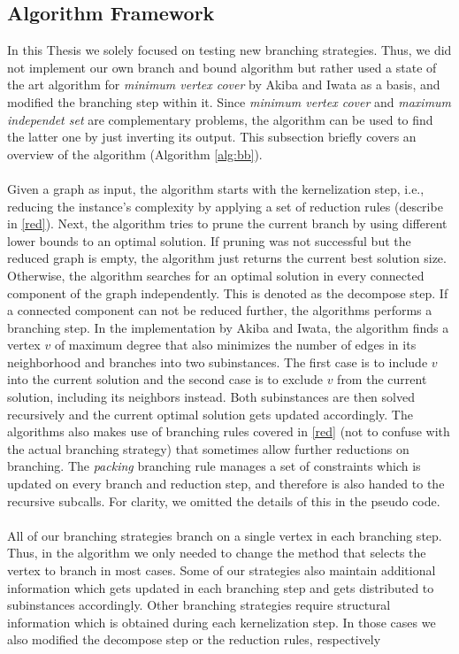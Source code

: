 \documentclass[]{article}
\begin{document}
\subsection{Algorithm Framework}

In this Thesis we solely focused on testing new branching strategies. Thus, we did not implement our own branch and bound algorithm but rather used a state of the art algorithm for \textit{minimum vertex cover} by Akiba and Iwata \cite{AkibaIwata} as a basis, and modified the branching step within it. Since \textit{minimum vertex cover} and \textit{maximum independet set} are complementary problems, the algorithm can be used to find the latter one by just inverting its output. This subsection briefly covers an overview of the algorithm (Algorithm \ref{alg:bb}).\\\\
Given a graph as input, the algorithm starts with the kernelization step, i.e., reducing the instance's complexity by applying a set of reduction rules (describe in \ref{red}). Next, the algorithm tries to prune the current branch by using different lower bounds to an optimal solution. If pruning was not successful but the reduced graph is empty, the algorithm just returns the current best solution size. Otherwise, the algorithm searches for an optimal solution in every connected component of the graph independently. This is denoted as the decompose step. If a connected component can not be reduced further, the algorithms performs a branching step. In the implementation by Akiba and Iwata, the algorithm finds a vertex $v$ of maximum degree that also minimizes the number of edges in its neighborhood and branches into two subinstances. The first case is to include $v$ into the current solution and the second case is to exclude $v$ from the current solution, including its neighbors instead. Both subinstances are then solved recursively and the current optimal solution gets updated accordingly. The algorithms also makes use of branching rules covered in \ref{red} (not to confuse with the actual branching strategy) that sometimes allow further reductions on branching. The \textit{packing} branching rule manages a set of constraints which is updated on every branch and reduction step, and therefore is also handed to the recursive subcalls. For clarity, we omitted the details of this in the pseudo code. \\\\  
All of our branching strategies branch on a single vertex in each branching step. Thus, in the algorithm we only needed to change the method that selects the vertex to branch in most cases. Some of our strategies also maintain additional information which gets updated in each branching step and gets distributed to subinstances accordingly. Other branching strategies require structural information which is obtained during each kernelization step. In those cases we also modified the decompose step or the reduction rules, respectively \\\\
\end{document}
